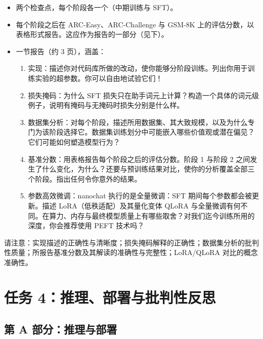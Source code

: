 \begin{itemize}
    \item 两个检查点，每个阶段各一个（中期训练与 SFT）。
    \item 每个阶段之后在 ARC-Easy、ARC-Challenge 与 GSM-8K 上的评估分数，以表格形式报告。这应作为报告的一部分（见下）。
    \item 一节报告（约 3 页），涵盖：
          \begin{enumerate}
              \item 实现：描述你对代码库所做的改动，使你能够分阶段训练。列出你用于训练实验的超参数。你可以自由地试验它们！
              \item 损失掩码：为什么 SFT 损失只在助手词元上计算？构造一个具体的词元级例子，说明有掩码与无掩码时损失分别是什么样。
              \item 数据集分析：对每个阶段，描述所用数据集、其大致规模，以及为什么专门为该阶段选择它。数据集训练划分中可能嵌入哪些价值观或潜在偏见？它们可能如何塑造模型行为？
              \item 基准分数：用表格报告每个阶段之后的评估分数。阶段 1 与阶段 2 之间发生了什么变化，为什么？还要与预训练结果对比，使你的分析覆盖全部三个阶段。指出任何令你意外的结果。
              \item 参数高效微调：nanochat 执行的是全量微调：SFT 期间每个参数都会被更新。描述 LoRA（低秩适配）及其量化变体 QLoRA 与全量微调有何不同。在算力、内存与最终模型质量上有哪些取舍？对我们迄今训练所用的深度，你会推荐使用 PEFT 技术吗？
          \end{enumerate}
\end{itemize}
请注意：实现描述的正确性与清晰度；损失掩码解释的正确性；数据集分析的批判性质量；所报告基准分数及其解读的准确性与完整性；LoRA/QLoRA 对比的概念准确性。


\section{任务 4：推理、部署与批判性反思}
\label{sec:task4}

\subsection{第 A 部分：推理与部署}

